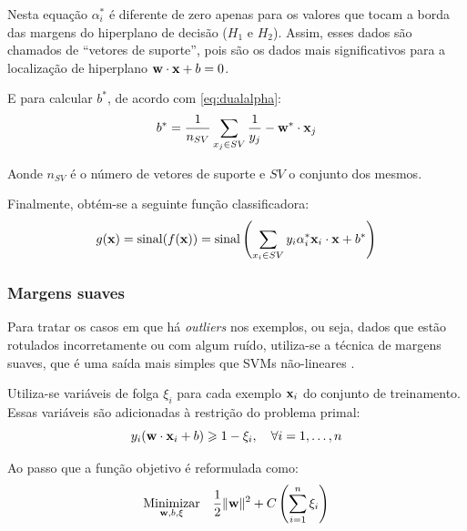 Nesta equação $\alpha_i^*$ é diferente de zero apenas para os valores que tocam a borda das margens do hiperplano de decisão ($H_1$ e $H_2$). Assim, esses dados são chamados de ``vetores de suporte'', pois são os dados mais significativos para a localização de hiperplano $\mathbf{w}\cdot\mathbf{x} + b = 0$.

E para calcular $b^*$, de acordo com \ref{eq:dualalpha}:
\begin{equation}\nonumber
  b^* = \frac{1}{n_{SV}}\sum_{x_j \in SV}{\frac{1}{y_j} - \mathbf{w^*}\cdot\mathbf{x}_j}
\end{equation}

Aonde $n_{SV}$ é o número de vetores de suporte e $SV$ o conjunto dos mesmos.

Finalmente, obtém-se a seguinte função classificadora:
\begin{equation}\label{eq:classificadora}
  g(\mathbf{x}) = \operatorname{sinal}(f(\mathbf{x}))
              = \operatorname{sinal}\left(
                  \sum_{x_i \in SV}{y_i\alpha_i^*\mathbf{x}_i\cdot\mathbf{x}+b^*}
                \right)
\end{equation}

\subsubsection{Margens suaves}


Para tratar os casos em que há \emph{outliers} nos exemplos, ou seja, dados que estão rotulados incorretamente ou com algum ruído, utiliza-se a técnica de margens suaves, que é uma saída mais simples que SVMs não-lineares \cite{burges1998tutorial}.

Utiliza-se variáveis de folga $\xi_i$ para cada exemplo $\mathbf{x}_i$ do conjunto de treinamento. Essas variáveis são adicionadas à restrição do problema primal:
\begin{equation}\label{eq:restrsuave}
  y_i(\mathbf{w}\cdot\mathbf{x}_i+b) \geqslant 1 - \xi_i,\quad\forall{i}=1,\dotsc,n
\end{equation}

Ao passo que a função objetivo é reformulada como:
\begin{equation}
  \underset{\mathbf{w}, b, \mathbf{\xi}}{\operatorname{Minimizar}}\quad
         \frac{1}{2}\lVert \mathbf{w} \rVert^2+C\left(\sum_{i=1}^n{\xi_i}\right)
\end{equation}

